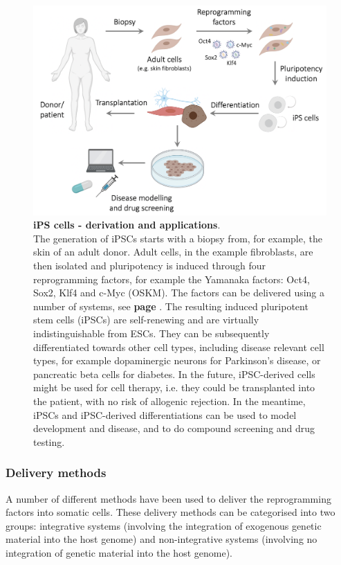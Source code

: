 \begin{figure}[htbp]
\centering
\includegraphics[width=14cm]{Chapter1/Fig/ipscs.png}
\caption[iPS cells]{\textbf{iPS cells - derivation and applications}.\\
The generation of iPSCs starts with a biopsy from, for example, the skin of an adult donor.
Adult cells, in the example fibroblasts, are then isolated and pluripotency is induced through four reprogramming factors, for example the Yamanaka factors: Oct4, Sox2, Klf4 and c-Myc (OSKM).
The factors can be delivered using a number of systems, see \textbf{page \pageref{sec:ipsc_delivery}}.
The resulting induced pluripotent stem cells (iPSCs) are self-renewing and are virtually indistinguishable from ESCs.
They can be subsequently differentiated towards other cell types, including disease relevant cell types, for example dopaminergic neurons for Parkinson's disease, or pancreatic beta cells for diabetes.
In the future, iPSC-derived cells might be used for cell therapy, i.e. they could be transplanted into the patient, with no risk of allogenic rejection.
In the meantime, iPSCs and iPSC-derived differentiations can be used to model development and disease, and to do compound screening and drug testing.}
\label{fig:ipsc}
\end{figure}


\subsubsection{Delivery methods}
\label{sec:ipsc_delivery}

A number of different methods have been used to deliver the reprogramming factors into somatic cells. 
These delivery methods can be categorised into two groups: integrative systems (involving the integration of exogenous genetic material into the host genome) and non-integrative systems (involving no integration of genetic material into the host genome). \\

